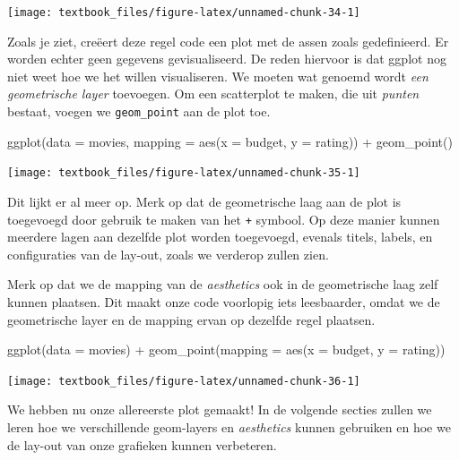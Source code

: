 \documentclass[]{tufte-book}
\newenvironment{Shaded}{}{}
\newcommand{\AttributeTok}[1]{\textcolor[rgb]{0.49,0.56,0.16}{#1}}
\newcommand{\FunctionTok}[1]{\textcolor[rgb]{0.02,0.16,0.49}{#1}}
\newcommand{\NormalTok}[1]{#1}
\newcommand{\SpecialCharTok}[1]{\textcolor[rgb]{0.25,0.44,0.63}{#1}}
\begin{document}
\texttt{[image: textbook\_files/figure-latex/unnamed-chunk-34-1]}

Zoals je ziet, creëert deze regel code een plot met de assen zoals gedefinieerd. Er worden echter geen gegevens gevisualiseerd. De reden hiervoor is dat ggplot nog niet weet hoe we het willen visualiseren. We moeten wat genoemd wordt \emph{een geometrische layer} toevoegen. Om een scatterplot te maken, die uit \emph{punten} bestaat, voegen we \texttt{geom\_point} aan de plot toe.

\begin{Shaded}
\begin{Highlighting}[]
\FunctionTok{ggplot}\NormalTok{(}\AttributeTok{data =}\NormalTok{ movies, }\AttributeTok{mapping =} \FunctionTok{aes}\NormalTok{(}\AttributeTok{x =}\NormalTok{ budget, }\AttributeTok{y =}\NormalTok{ rating)) }\SpecialCharTok{+}
  \FunctionTok{geom\_point}\NormalTok{()}
\end{Highlighting}
\end{Shaded}

\texttt{[image: textbook\_files/figure-latex/unnamed-chunk-35-1]}

Dit lijkt er al meer op. Merk op dat de geometrische laag aan de plot is toegevoegd door gebruik te maken van het \texttt{+} symbool. Op deze manier kunnen meerdere lagen aan dezelfde plot worden toegevoegd, evenals titels, labels, en configuraties van de lay-out, zoals we verderop zullen zien.

Merk op dat we de mapping van de \emph{aesthetics} ook in de geometrische laag zelf kunnen plaatsen. Dit maakt onze code voorlopig iets leesbaarder, omdat we de geometrische layer en de mapping ervan op dezelfde regel plaatsen.

\begin{Shaded}
\begin{Highlighting}[]
\FunctionTok{ggplot}\NormalTok{(}\AttributeTok{data =}\NormalTok{ movies) }\SpecialCharTok{+}
  \FunctionTok{geom\_point}\NormalTok{(}\AttributeTok{mapping =} \FunctionTok{aes}\NormalTok{(}\AttributeTok{x =}\NormalTok{ budget, }\AttributeTok{y =}\NormalTok{ rating))}
\end{Highlighting}
\end{Shaded}

\texttt{[image: textbook\_files/figure-latex/unnamed-chunk-36-1]}

We hebben nu onze allereerste plot gemaakt! In de volgende secties zullen we leren hoe we verschillende geom-layers en \emph{aesthetics} kunnen gebruiken en hoe we de lay-out van onze grafieken kunnen verbeteren.
\end{document}
